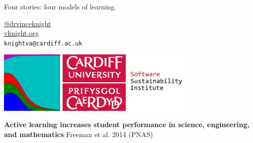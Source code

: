\documentclass{beamer}
\begin{document}
    \begin{frame}
        \begin{center}
            \Large

            Four stories: four models of learning.

            \normalsize
            \vspace{1cm}
            \href{https://twitter.com/drvinceknight}{@drvinceknight}\\
            \url{vknight.org}\\
            \texttt{knightva@cardiff.ac.uk}
        \end{center}


    \end{frame}

    \begin{frame}
        \centering

        \includegraphics[height=3cm]{static/axelrod_logo.png}
        \hfill
        \includegraphics[height=3cm]{static/CUident_CMYK.eps}
        \hfill
        \includegraphics[height=3cm]{static/ssi-logo.png}
    \end{frame}

    \begin{frame}
        \begin{center}
            \textbf{Active learning increases student performance in
            science, engineering, and mathematics} Freeman et al. 2014 (PNAS)
        \end{center}
    \end{frame}
\end{document}
